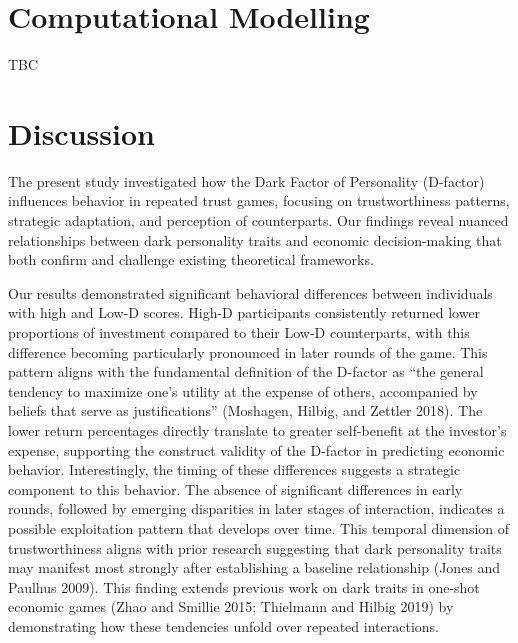 \documentclass[
]{article}
\begin{document}
\section{Computational Modelling}\label{computational-modelling}

TBC

\section{Discussion}\label{discussion}

The present study investigated how the Dark Factor of Personality (D-factor) influences behavior in repeated trust games, focusing on trustworthiness patterns, strategic adaptation, and perception of counterparts. Our findings reveal nuanced relationships between dark personality traits and economic decision-making that both confirm and challenge existing theoretical frameworks.

Our results demonstrated significant behavioral differences between individuals with high and Low-D scores. High-D participants consistently returned lower proportions of investment compared to their Low-D counterparts, with this difference becoming particularly pronounced in later rounds of the game. This pattern aligns with the fundamental definition of the D-factor as ``the general tendency to maximize one's utility at the expense of others, accompanied by beliefs that serve as justifications'' (Moshagen, Hilbig, and Zettler 2018). The lower return percentages directly translate to greater self-benefit at the investor's expense, supporting the construct validity of the D-factor in predicting economic behavior.
Interestingly, the timing of these differences suggests a strategic component to this behavior. The absence of significant differences in early rounds, followed by emerging disparities in later stages of interaction, indicates a possible exploitation pattern that develops over time. This temporal dimension of trustworthiness aligns with prior research suggesting that dark personality traits may manifest most strongly after establishing a baseline relationship (Jones and Paulhus 2009). This finding extends previous work on dark traits in one-shot economic games (Zhao and Smillie 2015; Thielmann and Hilbig 2019) by demonstrating how these tendencies unfold over repeated interactions.
\end{document}
